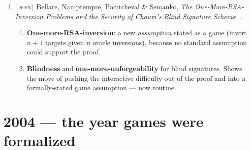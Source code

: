 \documentclass[11pt]{article}
\newcommand{\kind}[1]{{\footnotesize\textsc{\textcolor{yearcolor}{[#1]}}}\ }
\newcommand{\defn}{\kind{defn}}
\newcommand{\paper}[3]{#1, \emph{#2}~\cite{#3}.}
\begin{document}
\begin{enumerate}
  \item \defn \paper{Bellare, Namprempre, Pointcheval \& Semanko}{The
    One-More-RSA-Inversion Problems and the Security of Chaum's Blind Signature
    Scheme}{BNPS03}
    \begin{enumerate}
      \item \textbf{One-more-RSA-inversion}: a new \emph{assumption} stated as
        a game (invert $n+1$ targets given $n$ oracle inversions), because no
        standard assumption could support the proof.
      \item \textbf{Blindness} and \textbf{one-more-unforgeability} for blind
        signatures. Shows the move of pushing the interactive difficulty out of
        the proof and into a formally-stated game assumption --- now routine.
    \end{enumerate}
\end{enumerate}

\section{2004 --- the year games were formalized}
\end{document}
